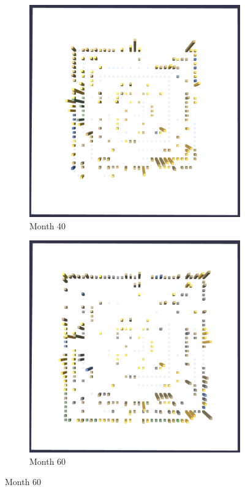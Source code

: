 \begin{figure}[t!]
    \medskip
    \begin{subfigure}{0.48\textwidth}
        \includegraphics[width=\linewidth]{JetUML_V2S3.png}
        \caption{Month 40} \label{fig:JetUML_V2S3}
    \end{subfigure}\hspace*{\fill}
    \begin{subfigure}{0.48\textwidth}
    \includegraphics[width=\linewidth]{JetUML_V2S4.png}
    \caption{Month 60} \label{fig:JetUML_V2S4}
    \end{subfigure}
    

\end{figure}
